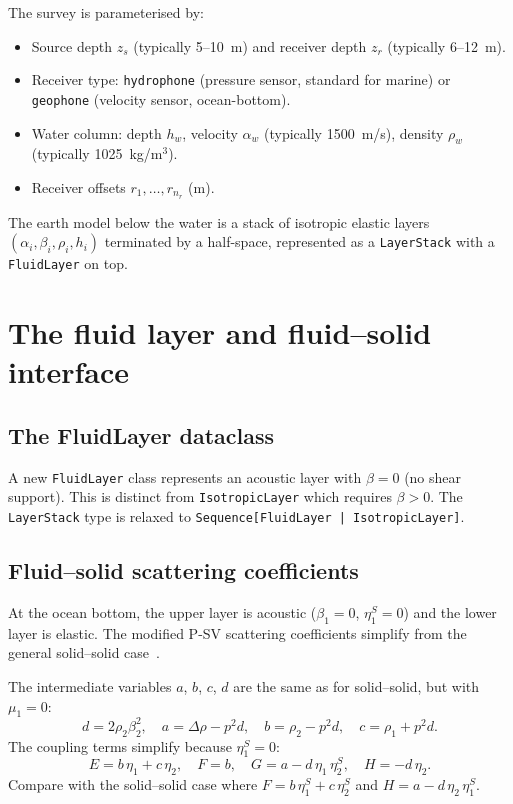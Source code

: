 \documentclass[11pt,a4paper]{article}
\newcommand{\D}{\Delta}
\begin{document}
The survey is parameterised by:
\begin{itemize}[nosep]
  \item Source depth $z_s$ (typically 5--10~m) and receiver depth
    $z_r$ (typically 6--12~m).
  \item Receiver type: \texttt{hydrophone} (pressure sensor,
    standard for marine) or \texttt{geophone} (velocity sensor,
    ocean-bottom).
  \item Water column: depth $h_w$, velocity $\alpha_w$ (typically
    1500~m/s), density $\rho_w$ (typically 1025~kg/m$^3$).
  \item Receiver offsets $r_1, \ldots, r_{n_r}$ (m).
\end{itemize}

The earth model below the water is a stack of isotropic elastic
layers $(\alpha_i, \beta_i, \rho_i, h_i)$ terminated by a
half-space, represented as a \texttt{LayerStack} with a
\texttt{FluidLayer} on top.

\section{The fluid layer and fluid--solid interface}
\label{sec:fluid}

\subsection{The FluidLayer dataclass}

A new \texttt{FluidLayer} class represents an acoustic layer with
$\beta = 0$ (no shear support).  This is distinct from
\texttt{IsotropicLayer} which requires $\beta > 0$.  The
\texttt{LayerStack} type is relaxed to
\texttt{Sequence[FluidLayer\,|\,IsotropicLayer]}.

\subsection{Fluid--solid scattering coefficients}

At the ocean bottom, the upper layer is acoustic ($\beta_1 = 0$,
$\eta^S_1 = 0$) and the lower layer is elastic.  The modified
P-SV scattering coefficients simplify from the general solid--solid
case~\cite{kennett1983}.

The intermediate variables $a$, $b$, $c$, $d$ are the same as
for solid--solid, but with $\mu_1 = 0$:
\begin{equation}\label{eq:abcd}
  d = 2\rho_2 \beta_2^2, \quad
  a = \D\rho - p^2 d, \quad
  b = \rho_2 - p^2 d, \quad
  c = \rho_1 + p^2 d.
\end{equation}
The coupling terms simplify because $\eta^S_1 = 0$:
\begin{equation}\label{eq:EFGH}
  E = b\,\eta_1 + c\,\eta_2, \quad
  F = b, \quad
  G = a - d\,\eta_1\,\eta^S_2, \quad
  H = -d\,\eta_2.
\end{equation}
Compare with the solid--solid case where $F = b\,\eta^S_1 + c\,\eta^S_2$
and $H = a - d\,\eta_2\,\eta^S_1$.
\end{document}
